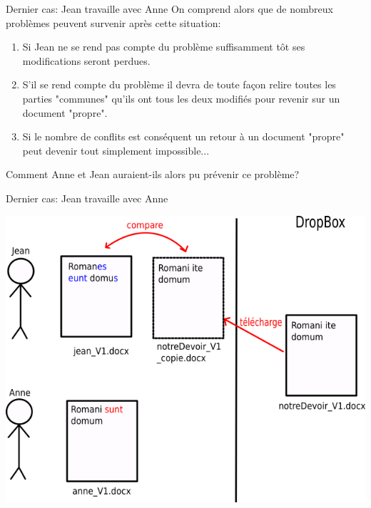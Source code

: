 \documentclass{beamer}
\begin{document}
\begin{frame}{Dernier cas: Jean travaille avec Anne}
On comprend alors que de nombreux problèmes peuvent survenir après cette situation:
\medskip
\begin{enumerate}
    \item Si Jean ne se rend pas compte du problème suffisamment tôt ses modifications seront perdues.
    \item S'il se rend compte du problème il devra de toute façon relire toutes les parties "communes" qu'ils ont tous les deux modifiés pour revenir sur un document "propre".
    \item Si le nombre de conflits est conséquent un retour à un document "propre" peut devenir tout simplement impossible...
\end{enumerate}
\medskip
Comment Anne et Jean auraient-ils alors pu prévenir ce problème?
\end{frame}

\begin{frame}{Dernier cas: Jean travaille avec Anne}
\begin{center}
    \includegraphics[scale=0.4]{images/lastScenario/lastScenario_pullpush1.png}
\end{center}
\end{frame}
\end{document}
